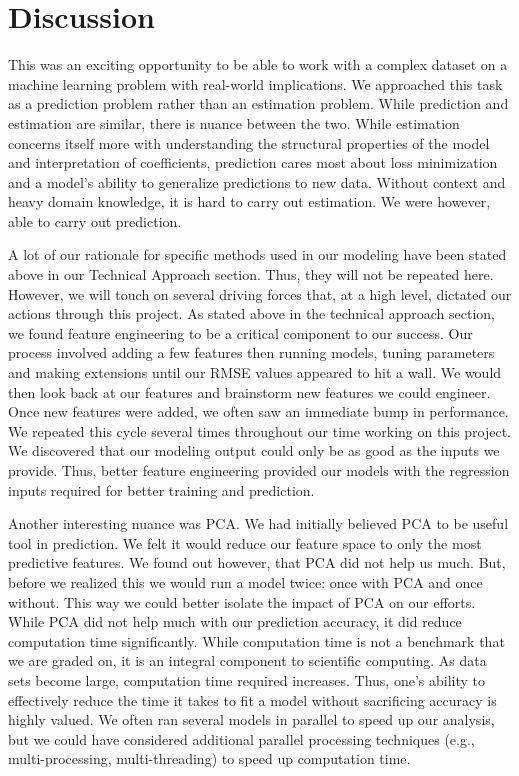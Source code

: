 \documentclass[11pt, oneside]{article}   	%
\begin{document}
\section{Discussion}
This was an exciting opportunity to be able to work with a complex dataset on a machine learning problem with real-world implications. We approached this task as a prediction problem rather than an estimation problem. While prediction and estimation are similar, there is nuance between the two. While estimation concerns itself more with understanding the structural properties of the model and interpretation of coefficients, prediction cares most about loss minimization and a model's ability to generalize predictions to new data. Without context and heavy domain knowledge, it is hard to carry out estimation. We were however, able to carry out prediction. 

A lot of our rationale for specific methods used in our modeling have been stated above in our Technical Approach section. Thus, they will not be repeated here. However, we will touch on several driving forces that, at a high level, dictated our actions through this project. As stated above in the technical approach section, we found feature engineering to be a critical component to our success. Our process involved adding a few features then running models, tuning parameters and making extensions until our RMSE values appeared to hit a wall. We would then look back at our features and brainstorm new features we could engineer. Once new features were added, we often saw an immediate bump in performance. We repeated this cycle several times throughout our time working on this project. We discovered that our modeling output could only be as good as the inputs we provide. Thus, better feature engineering provided our models with the regression inputs required for better training and prediction. 

Another interesting nuance was PCA. We had initially believed PCA to be useful tool in prediction. We felt it would reduce our feature space to only the most predictive features. We found out however, that PCA did not help us much. But, before we realized this we would run a model twice: once with PCA and once without. This way we could better isolate the impact of PCA on our efforts. While PCA did not help much with our prediction accuracy, it did reduce computation time significantly. While computation time is not a benchmark that we are graded on, it is an integral component to scientific computing. As data sets become large, computation time required increases. Thus, one's ability to effectively reduce the time it takes to fit a model without sacrificing accuracy is highly valued. We often ran several models in parallel to speed up our analysis, but we could have considered additional parallel processing techniques (e.g., multi-processing, multi-threading) to speed up computation time.
\end{document}
